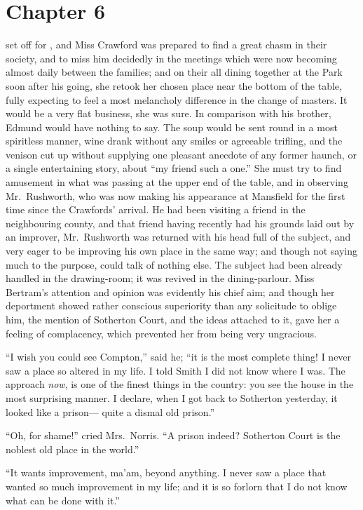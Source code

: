 \chapter{Chapter 6}

 set off for \gdash{}, and Miss Crawford
was prepared to find a great chasm in their society,
and to miss him decidedly in the meetings which were now
becoming almost daily between the families; and on their
all dining together at the Park soon after his going,
she retook her chosen place near the bottom of the table,
fully expecting to feel a most melancholy difference in
the change of masters.  It would be a very flat business,
she was sure.  In comparison with his brother, Edmund would
have nothing to say.  The soup would be sent round in a
most spiritless manner, wine drank without any smiles
or agreeable trifling, and the venison cut up without
supplying one pleasant anecdote of any former haunch,
or a single entertaining story, about ``my friend such a one.''
She must try to find amusement in what was passing at the
upper end of the table, and in observing Mr.\ Rushworth,
who was now making his appearance at Mansfield for the first
time since the Crawfords' arrival.  He had been visiting
a friend in the neighbouring county, and that friend
having recently had his grounds laid out by an improver,
Mr.\ Rushworth was returned with his head full of the subject,
and very eager to be improving his own place in the same way;
and though not saying much to the purpose, could talk
of nothing else.  The subject had been already handled
in the drawing-room; it was revived in the dining-parlour.
Miss Bertram's attention and opinion was evidently
his chief aim; and though her deportment showed rather
conscious superiority than any solicitude to oblige him,
the mention of Sotherton Court, and the ideas attached
to it, gave her a feeling of complacency, which prevented
her from being very ungracious.

``I wish you could see Compton,'' said he; ``it is the most
complete thing!  I never saw a place so altered in my life.
I told Smith I did not know where I was.  The approach \emph{now},
is one of the finest things in the country:  you see the
house in the most surprising manner.  I declare, when I
got back to Sotherton yesterday, it looked like a prison---%
quite a dismal old prison.''

``Oh, for shame!'' cried Mrs.\ Norris.  ``A prison indeed?
Sotherton Court is the noblest old place in the world.''

``It wants improvement, ma'am, beyond anything.  I never
saw a place that wanted so much improvement in my life;
and it is so forlorn that I do not know what can be done
with it.''


